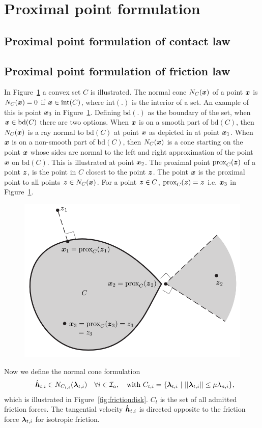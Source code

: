 \documentclass[DC2017114Bouma.tex]{subfiles}
\begin{document}
\section{Proximal point formulation}
\subsection{Proximal point formulation of contact law}


\subsection{Proximal point formulation of friction law}
In Figure~\ref{fig:convex} a convex set $C$ is illustrated. The normal cone $N_C({\boldsymbol{x}})$ of a point ${\boldsymbol{x}}$ is $N_C({\boldsymbol{x}})=0$ if ${\boldsymbol{x}}\in \text{int}(C)$, where $\text{int}(.)$ is the interior of a set. An example of this is point ${\boldsymbol{x}}_3$ in Figure~\ref{fig:convex}. Defining $\text{bd}(.)$ as the boundary of the set, when ${\boldsymbol{x}}\in \text{bd}(C)$ there are two options. When ${\boldsymbol{x}}$ is on a smooth part of $\text{bd}(C)$, then $N_C({\boldsymbol{x}})$ is a ray normal to $\text{bd}(C)$ at point ${\boldsymbol{x}}$ as depicted in at point ${\boldsymbol{x}}_1$. When ${\boldsymbol{x}}$ is on a non-smooth part of $\text{bd}(C)$, then $N_C({\boldsymbol{x}})$ is a cone starting on the point ${\boldsymbol{x}}$ whose sides are normal to the left and right approximation of the point ${\boldsymbol{x}}$ on $\text{bd}(C)$. This is illustrated at point ${\boldsymbol{x}}_2$. The proximal point $\operatorname{\text{prox}}_C({\boldsymbol{z}})$ of a point ${\boldsymbol{z}}$, is the point in $C$ closest to the point ${\boldsymbol{z}}$. The point ${\boldsymbol{x}}$ is the proximal point to all points  ${\boldsymbol{z}}\in N_C({\boldsymbol{x}})$. For a point ${\boldsymbol{z}}\in C$, $\operatorname{\text{prox}}_C({\boldsymbol{z}}) = {\boldsymbol{z}}$ i.e. ${\boldsymbol{x}}_3$ in Figure~\ref{fig:convex}.
\begin{figure}[h]
\centering
\includegraphics[width=.7\textwidth]{convex.PNG}\caption{}\label{fig:convex}
\end{figure}

Now we define the normal cone formulation
\begin{align}
-\dot{\hb}_{t,i} \in N_{C_{t,i}}(\lambdab_{t,i})\quad \forall i\in\Ic_a,\quad \text{with }C_{t,i} = \{\lambdab_{t,i}\ |\ ||\lambdab_{t,i}|| \leq \mu\lambda_{n,i}\},
\end{align}
which is illustrated in Figure~\ref{fig:frictiondisk}. $C_t$ is the set of all admitted friction forces. The tangential velocity $\dot{{\boldsymbol{h}}}_{t,i}$ is directed opposite to the friction force $\boldsymbol{\lambda}_{t,i}$ for isotropic friction.
\end{document}

